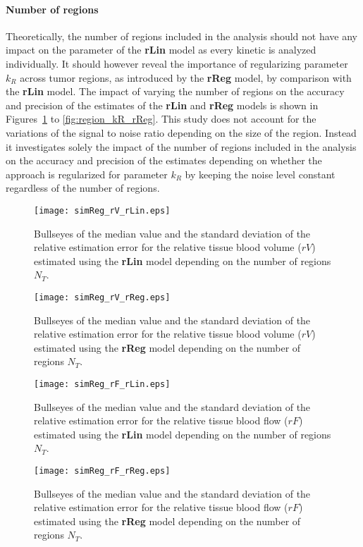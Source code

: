 \paragraph{Number of regions}
Theoretically, the number of regions included in the analysis should not have any impact on the parameter of the \textbf{rLin} model as every kinetic is analyzed individually.
It should however reveal the importance of regularizing parameter $k_R$ across tumor regions, as introduced by the \textbf{rReg} model, by comparison with the \textbf{rLin} model.
The impact of varying the number of regions on the accuracy and precision of the estimates of the \textbf{rLin} and \textbf{rReg} models is shown in Figures~\ref{fig:region_rV_rLin} to \ref{fig:region_kR_rReg}.
This study does not account for the variations of the signal to noise ratio depending on the size of the region.
Instead it investigates solely the impact of the number of regions included in the analysis on the accuracy and precision of the estimates depending on whether the approach is regularized for parameter $k_R$ by keeping the noise level constant regardless of the number of regions.

\begin{figure}
\texttt{[image: simReg\_rV\_rLin.eps]}
\caption{Bullseyes of the median value and the standard deviation of the relative estimation error for the relative tissue blood volume ($rV$) estimated using the \textbf{rLin} model depending on the number of regions $N_T$.}
\label{fig:region_rV_rLin}
\end{figure}

\begin{figure}
\texttt{[image: simReg\_rV\_rReg.eps]}
\caption{Bullseyes of the median value and the standard deviation of the relative estimation error for the relative tissue blood volume ($rV$) estimated using the \textbf{rReg} model depending on the number of regions $N_T$.}
\label{fig:region_rV_rReg}
\end{figure}

\begin{figure}
\texttt{[image: simReg\_rF\_rLin.eps]}
\caption{Bullseyes of the median value and the standard deviation of the relative estimation error for the relative tissue blood flow ($rF$) estimated using the \textbf{rLin} model depending on the number of regions $N_T$.}
\label{fig:region_rF_rLin}
\end{figure}

\begin{figure}
\texttt{[image: simReg\_rF\_rReg.eps]}
\caption{Bullseyes of the median value and the standard deviation of the relative estimation error for the relative tissue blood flow ($rF$) estimated using the \textbf{rReg} model depending on the number of regions $N_T$.}
\label{fig:region_rF_rReg}
\end{figure}

